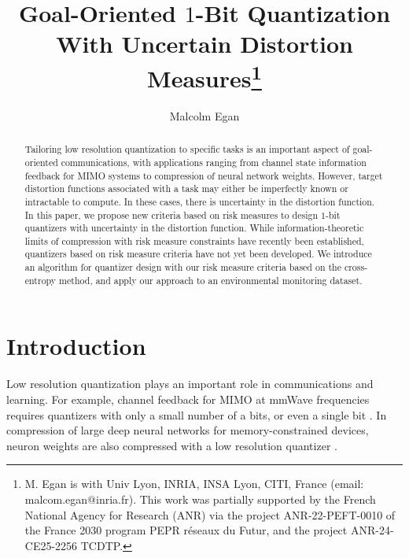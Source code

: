 \documentclass[conference]{IEEEtran}
\begin{document}
	
	\title{Goal-Oriented $1$-Bit Quantization With Uncertain Distortion Measures\thanks{M. Egan is with Univ Lyon, INRIA, INSA Lyon, CITI, France (email: malcom.egan@inria.fr). This work was partially supported by the French National Agency for Research (ANR) via the project ANR-22-PEFT-0010 of the France 2030 program PEPR réseaux du Futur, and the project ANR-24-CE25-2256 TCDTP.}}
	

\author{Malcolm Egan}

\maketitle

\begin{abstract}
Tailoring low resolution quantization to specific tasks is an important aspect of goal-oriented communications, with applications ranging from channel state information feedback for MIMO systems to compression of neural network weights. However, target distortion functions associated with a task may either be imperfectly known or intractable to compute. In these cases, there is uncertainty in the distortion function. In this paper, we propose new criteria based on risk measures to design $1$-bit quantizers with uncertainty in the distortion function. While information-theoretic limits of compression with risk measure constraints have recently been established, quantizers based on risk measure criteria have not yet been developed. We introduce an algorithm for quantizer design with our risk measure criteria based on the cross-entropy method, and apply our approach to an environmental monitoring dataset. 
\end{abstract}


\maketitle

\section{Introduction}

Low resolution quantization plays an important role in communications and learning. For example, channel feedback for MIMO at mmWave frequencies requires quantizers with only a small number of a bits, or even a single bit \cite{Mo2015capacity}. In compression of large deep neural networks for memory-constrained devices, neuron weights are also compressed with a low resolution quantizer \cite{Nahshan2021loss}. 
\end{document}
